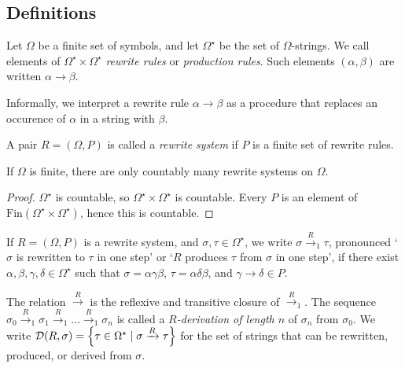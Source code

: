 \subsection{Definitions}
\begin{definition}
	Let \( \Omega \) be a finite set of symbols, and let \( \Omega^\star \) be the set of \( \Omega \)-strings.
	We call elements of \( \Omega^\star \times \Omega^\star \) \emph{rewrite rules} or \emph{production rules}.
	Such elements \( (\alpha, \beta) \) are written \( \alpha \to \beta \).
\end{definition}
Informally, we interpret a rewrite rule \( \alpha \to \beta \) as a procedure that replaces an occurence of \( \alpha \) in a string with \( \beta \).
\begin{definition}
	A pair \( R = (\Omega, P) \) is called a \emph{rewrite system} if \( P \) is a finite set of rewrite rules.
\end{definition}
\begin{proposition}
	If \( \Omega \) is finite, there are only countably many rewrite systems on \( \Omega \).
\end{proposition}
\begin{proof}
	\( \Omega^\star \) is countable, so \( \Omega^\star \times \Omega^\star \) is countable.
	Every \( P \) is an element of \( \mathrm{Fin}(\Omega^\star \times \Omega^\star) \), hence this is countable.
\end{proof}
\begin{definition}
	If \( R = (\Omega, P) \) is a rewrite system, and \( \sigma, \tau \in \Omega^\star \), we write \( \sigma \xrightarrow R_1 \tau \), pronounced `\( \sigma \) is rewritten to \( \tau \) in one step' or `\( R \) produces \( \tau \) from \( \sigma \) in one step', if there exist \( \alpha, \beta, \gamma, \delta \in \Omega^\star \) such that \( \sigma = \alpha \gamma \beta \), \( \tau = \alpha \delta \beta \), and \( \gamma \to \delta \in P \).

	The relation \( \xrightarrow R \) is the reflexive and transitive closure of \( \xrightarrow R_1 \).
	The sequence \( \sigma_0 \xrightarrow R_1 \sigma_1 \xrightarrow R_1 \dots \xrightarrow R_1 \sigma_n \) is called a \emph{\( R \)-derivation of length \( n \)} of \( \sigma_n \) from \( \sigma_0 \).
	We write \( \mathcal D(R, \sigma) = \qty{\tau \in \Omega^\star \mid \sigma \xrightarrow R \tau} \) for the set of strings that can be rewritten, produced, or derived from \( \sigma \).
\end{definition}

